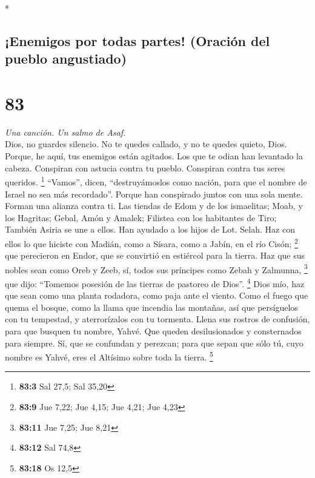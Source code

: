 \begin{paracol}{2}
\switchcolumn[0]*

\hypertarget{enemigos-por-todas-partes-oraciuxf3n-del-pueblo-angustiado}{%
\subsection{¡Enemigos por todas partes! (Oración del pueblo
angustiado)}\label{enemigos-por-todas-partes-oraciuxf3n-del-pueblo-angustiado}}

\hypertarget{section-164}{%
\section{83}\label{section-164}}

\emph{Una canción. Un salmo de Asaf.}\\
 Dios, no guardes silencio. No te quedes callado, y no te
quedes quieto, Dios.  Porque, he aquí, tus enemigos están
agitados. Los que te odian han levantado la cabeza. 
Conspiran con astucia contra tu pueblo. Conspiran contra tus seres
queridos. \footnote{\textbf{83:3} Sal 27,5; Sal 35,20} 
``Vamos'', dicen, ``destruyámoslos como nación, para que el nombre de
Israel no sea más recordado''.  Porque han conspirado
juntos con una sola mente. Forman una alianza contra ti. 
Las tiendas de Edom y de los ismaelitas; Moab, y los Hagritas;
 Gebal, Amón y Amalek; Filistea con los habitantes de
Tiro;  También Asiria se une a ellos. Han ayudado a los
hijos de Lot. Selah.  Haz con ellos lo que hiciste con
Madián, como a Sísara, como a Jabín, en el río Cisón; \footnote{\textbf{83:9}
  Jue 7,22; Jue 4,15; Jue 4,21; Jue 4,23}  que perecieron
en Endor, que se convirtió en estiércol para la tierra. 
Haz que sus nobles sean como Oreb y Zeeb, sí, todos sus príncipes como
Zebah y Zalmunna, \footnote{\textbf{83:11} Jue 7,25; Jue 8,21}
 que dijo: ``Tomemos posesión de las tierras de pastoreo
de Dios''. \footnote{\textbf{83:12} Sal 74,8}  Dios mío,
haz que sean como una planta rodadora, como paja ante el viento.
 Como el fuego que quema el bosque, como la llama que
incendia las montañas,  así que persíguelos con tu
tempestad, y aterrorízalos con tu tormenta.  Llena sus
rostros de confusión, para que busquen tu nombre, Yahvé. 
Que queden desilusionados y consternados para siempre. Sí, que se
confundan y perezcan;  para que sepan que sólo tú, cuyo
nombre es Yahvé, eres el Altísimo sobre toda la tierra. \footnote{\textbf{83:18}
  Os 12,5}


\end{paracol}
